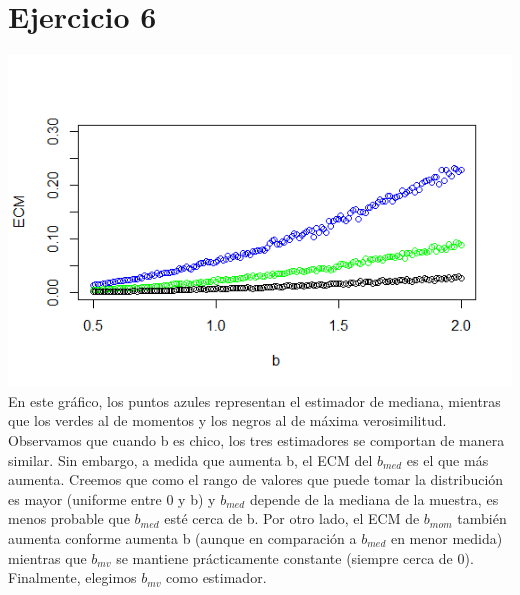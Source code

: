 \documentclass{article}
\begin{document}
\section{Ejercicio 6}
\includegraphics[scale=0.85]{ej6.png}
En este gráfico, los puntos azules representan el estimador de mediana, mientras que los verdes al de momentos y los negros al de máxima verosimilitud. Observamos que cuando b es chico, los tres estimadores se comportan de manera similar. Sin embargo, a medida que aumenta b, el ECM del $b_{med}$ es el que más aumenta. Creemos que como el rango de valores que puede tomar la distribución es mayor (uniforme entre 0 y b) y $b_{med}$ depende de la mediana de la muestra, es menos probable que $b_{med}$ esté cerca de b. Por otro lado, el ECM de $b_{mom}$ también aumenta conforme aumenta b (aunque en comparación a $b_{med}$ en menor medida) mientras que $b_{mv}$ se mantiene prácticamente constante (siempre cerca de 0). Finalmente, elegimos $b_{mv}$ como estimador.
\end{document}
